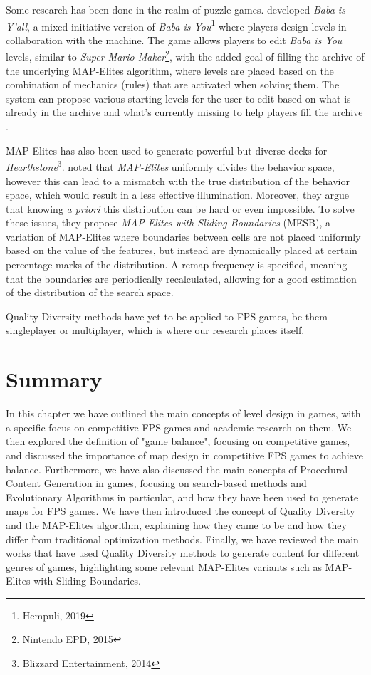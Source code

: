 Some research has been done in the realm of puzzle games.  developed \textit{Baba is Y'all}, a mixed-initiative version of \textit{Baba is You}\footnote{Hempuli, 2019} where players design levels in collaboration with the machine. The game allows players to edit \textit{Baba is You} levels, similar to \textit{Super Mario Maker}\footnote{Nintendo EPD, 2015}, with the added goal of filling the archive of the underlying MAP-Elites algorithm, where levels are placed based on the combination of mechanics (rules) that are activated when solving them. The system can propose various starting levels for the user to edit based on what is already in the archive and what's currently missing to help players fill the archive \cite{charity_baba_2020}. 

MAP-Elites has also been used to generate powerful but diverse decks for \textit{Hearthstone}\footnote{Blizzard Entertainment, 2014}. \citeauthor{fontaine_mapping_2019} noted that \textit{MAP-Elites} uniformly divides the behavior space, however this can lead to a mismatch with the true distribution of the behavior space, which would result in a less effective illumination. Moreover, they argue that knowing \textit{a priori} this distribution can be hard or even impossible. To solve these issues, they propose \textit{MAP-Elites with Sliding Boundaries} (MESB), a variation of MAP-Elites where boundaries between cells are not placed uniformly based on the value of the features, but instead are dynamically placed at certain percentage marks of the distribution. A remap frequency is specified, meaning that the boundaries are periodically recalculated, allowing for a good estimation of the distribution of the search space. \cite{fontaine_mapping_2019}

Quality Diversity methods have yet to be applied to FPS games, be them singleplayer or multiplayer, which is where our research places itself.

\section{Summary}
\label{sec:ch1_summary}
In this chapter we have outlined the main concepts of level design in games, with a specific focus on competitive FPS games and academic research on them. We then explored the definition of "game balance", focusing on competitive games, and discussed the importance of map design in competitive FPS games to achieve balance. Furthermore, we have also discussed the main concepts of Procedural Content Generation in games, focusing on search-based methods and Evolutionary Algorithms in particular, and how they have been used to generate maps for FPS games. We have then introduced the concept of Quality Diversity and the MAP-Elites algorithm, explaining how they came to be and how they differ from traditional optimization methods. Finally, we have reviewed the main works that have used Quality Diversity methods to generate content for different genres of games, highlighting some relevant MAP-Elites variants such as MAP-Elites with Sliding Boundaries.
